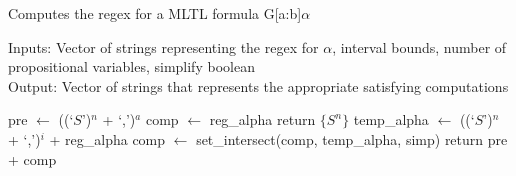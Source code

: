 \documentclass[runningheads]{llncs}
\begin{document}
\begin{algorithm}[H]
\caption{Computes the regex for a MLTL formula G[a:b]$\alpha$}
Inputs: Vector of strings representing the regex for $\alpha$, interval bounds, number of propositional variables, simplify boolean\\
Output: Vector of strings that represents the appropriate satisfying computations
\begin{algorithmic}
    \State pre $\leftarrow$ ((`$S$')$^{n}$ + `,')$^{a}$ 
    \State comp $\leftarrow$ reg\_alpha 
     
        \State return $\{S^n\}$
    \EndIf
     
        \State temp\_alpha $\leftarrow$ ((`$S$')$^{n}$ + `,')$^{i}$ + reg\_alpha
        \State comp $\leftarrow$ set\_intersect(comp, temp\_alpha, simp)
    \EndFor
    \State return pre + comp 
\EndProcedure
\end{algorithmic}
\end{algorithm}
 
\end{document}
